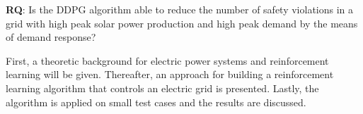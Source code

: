 \documentclass[class=book, crop=false]{standalone}
\begin{document}
\begin{displayquote}
\textbf{RQ}: Is the DDPG algorithm able to reduce the number of safety violations in a grid with high peak solar power production and high peak demand by the means of demand response? 
\end{displayquote}

First, a theoretic background for electric power systems and reinforcement learning will be given. Thereafter, an approach for building a reinforcement learning algorithm that controls an electric grid is presented. Lastly, the algorithm is applied on small test cases and the results are discussed.
\end{document}
